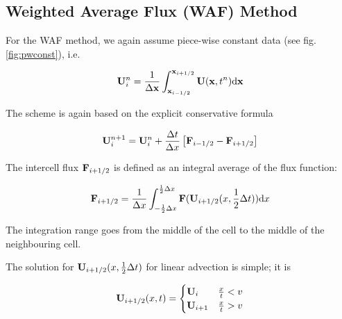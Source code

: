 \subsection{Weighted Average Flux (WAF) Method}



For the WAF method, we again assume piece-wise constant data (see fig. \ref{fig:pwconst}), i.e.

\begin{equation}
	\mathbf{U}_i ^ n = \frac{1}{\Delta \mathbf{x}} \int_{\mathbf{x}_{i-1/2}}^{\mathbf{x}_{i+1/2}} \mathbf{U}(\mathbf{x}, t^n) \mathrm{d} \mathbf{x}
\end{equation}

The scheme is again based on the explicit conservative formula

\begin{equation}
	\mathbf{U}_{i}^{n+1} = \mathbf{U}_i^n + \frac{\Delta t}{\Delta x} \left[ \mathbf{F}_{i - 1/2} - \mathbf{F}_{i + 1/2} \right] \label{eq:advection_basics_waf}
\end{equation}



The intercell flux $\mathbf{F}_{i + 1/2}$ is defined as an integral average of the flux function:

\begin{equation}
	\mathbf{F}_{i + 1/2} = \frac{1}{\Delta x} \int_{-\frac{1}{2} \Delta x} ^{\frac{1}{2} \Delta x} \mathbf{F} (\mathbf{U}_{i+1/2} ( x, \frac{1}{2}\Delta t)) \mathrm{d} x \label{eq:waf-flux}
\end{equation}

The integration range goes from the middle of the cell to the middle of the neighbouring cell.

The solution for $\mathbf{U}_{i+1/2} ( x, \frac{1}{2}\Delta t)$ for linear advection is simple; it is

\begin{align}
	\mathbf{U}_{i+1/2} ( x, t) = 
		\begin{cases}
			\mathbf{U}_i 		& \frac{x}{t} < v \\
			\mathbf{U}_{i+1} 	& \frac{x}{t} > v \\
		\end{cases}
\end{align}



